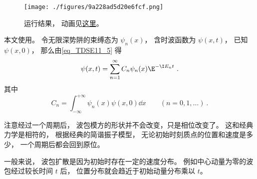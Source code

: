 

\begin{figure}[ht]
\centering
\texttt{[image: ./figures/9a228ad5d20e6fcf.png]}
\caption{运行结果， 动画见\href{https://wuli.wiki/apps/SHOgs.html}{这里}。} \label{fig_SHOgs_1}
\end{figure}

本文使用。 令无限深势阱的束缚态为 $\psi_n(x)$， 含时波函数为 $\psi(x, t)$， 已知 $\psi(x, 0)$， 那么由\autoref{eq_TDSE11_5}  得
\begin{equation}
\psi(x, t) = \sum_{n=1}^\infty C_n\psi_n(x)\E^{-\I E_n t}~.
\end{equation}
其中
\begin{equation}
C_n = \int_{-\infty}^{+\infty} \psi_n(x)\psi(x, 0) \dd{x} \qquad (n=0,1,\dots)~.
\end{equation}

注意经过一个周期后， 波包模方的形状并不会改变，只是相位改变了。 这和经典力学是相符的， 根据经典的简谐振子模型， 无论初始时刻质点的位置和速度是多少， 一个周期后都会回到原位。

一般来说， 波包扩散是因为初始时存在一定的速度分布。 例如中心动量为零的波包经过较长时间 $t$ 后， 位置分布就会趋近于初始动量分布乘以 $t$。

